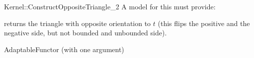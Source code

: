 \begin{ccRefFunctionObjectConcept}{Kernel::ConstructOppositeTriangle_2}
A model for this must provide:


       {returns the triangle with opposite orientation to $t$
        (this flips the positive and the negative side, but
        not bounded and unbounded side).}

\ccRefines
AdaptableFunctor (with one argument)

\ccSeeAlso
{} \\

\end{ccRefFunctionObjectConcept}
